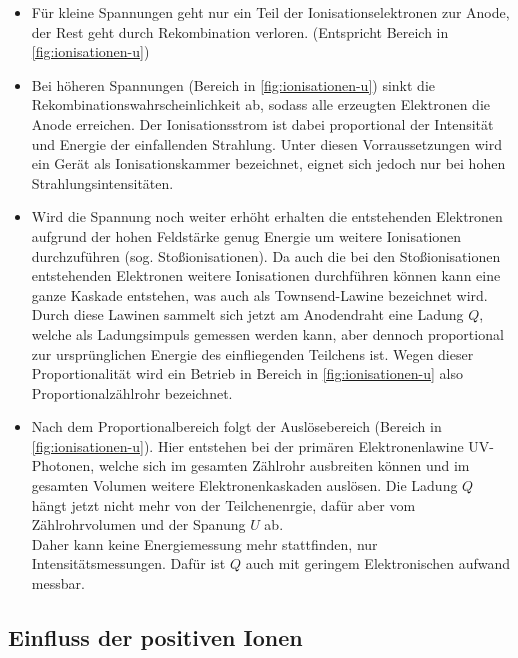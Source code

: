 \begin{itemize}
	\item Für kleine Spannungen geht nur ein Teil der Ionisationselektronen zur Anode, der Rest geht 
		durch Rekombination verloren. (Entspricht Bereich  in \autoref{fig:ionisationen-u})
	\item Bei höheren Spannungen (Bereich  in \autoref{fig:ionisationen-u})
		sinkt die Rekombinationswahrscheinlichkeit ab, sodass alle erzeugten Elektronen
		die Anode erreichen. Der Ionisationsstrom ist dabei proportional der Intensität und Energie
		der einfallenden Strahlung. Unter diesen Vorraussetzungen wird ein Gerät als Ionisationskammer
		bezeichnet, eignet sich jedoch nur bei hohen Strahlungsintensitäten.
	\item Wird die Spannung noch weiter erhöht erhalten die entstehenden Elektronen aufgrund der hohen Feldstärke
		genug Energie um weitere Ionisationen durchzuführen (sog. Stoßionisationen). Da auch die bei den
		Stoßionisationen entstehenden Elektronen weitere Ionisationen durchführen können kann eine ganze
		Kaskade entstehen, was auch als Townsend-Lawine bezeichnet wird.
		\\
		Durch diese Lawinen sammelt sich jetzt am Anodendraht eine Ladung $Q$, welche als Ladungsimpuls 
		gemessen werden kann, aber dennoch proportional zur ursprünglichen Energie des einfliegenden
		Teilchens ist. Wegen dieser Proportionalität wird ein Betrieb in Bereich  in 
		\autoref{fig:ionisationen-u} also Proportionalzählrohr bezeichnet.
	\item Nach dem Proportionalbereich folgt der Auslösebereich (Bereich  in
		\autoref{fig:ionisationen-u}). Hier entstehen bei der primären Elektronenlawine UV-Photonen, welche
		sich im gesamten Zählrohr ausbreiten können und im gesamten Volumen weitere Elektronenkaskaden auslösen.
		Die Ladung $Q$ hängt jetzt nicht mehr von der Teilchenenrgie, dafür aber vom Zählrohrvolumen und der 
		Spanung $U$ ab.
		\\
		Daher kann keine Energiemessung mehr stattfinden, nur Intensitätsmessungen. Dafür ist $Q$ auch mit
		geringem Elektronischen aufwand messbar.
\end{itemize}



\subsection{Einfluss der positiven Ionen}
\label{sec:einfluss-ionen}

